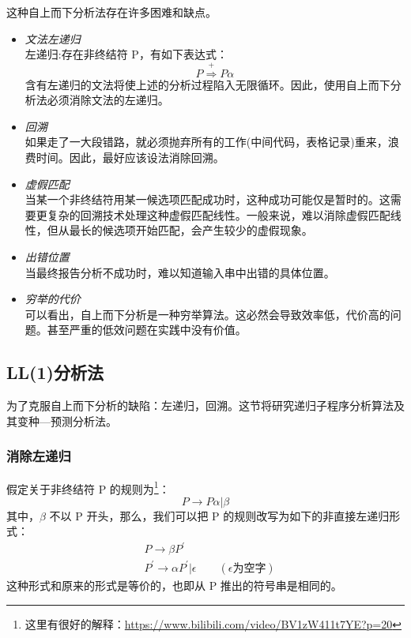 这种自上而下分析法存在许多困难和缺点。
\begin{itemize}
    \item \textit{文法左递归} \\
          左递归:存在非终结符 P，有如下表达式：
          \[P \stackrel{+}{\Rightarrow} P \alpha \]
          含有左递归的文法将使上述的分析过程陷入无限循环。因此，使用自上而下分析法必须消除文法的左递归。
    \item \textit{回溯} \\
          如果走了一大段错路，就必须抛弃所有的工作(中间代码，表格记录)重来，浪费时间。因此，最好应该设法消除回溯。
    \item \textit{虚假匹配} \\
          当某一个非终结符用某一候选项匹配成功时，这种成功可能仅是暂时的。这需要更复杂的回溯技术处理这种虚假匹配线性。一般来说，难以消除虚假匹配线性，但从最长的候选项开始匹配，会产生较少的虚假现象。
    \item \textit{出错位置} \\
          当最终报告分析不成功时，难以知道输入串中出错的具体位置。
    \item \textit{穷举的代价} \\
          可以看出，自上而下分析是一种穷举算法。这必然会导致效率低，代价高的问题。甚至严重的低效问题在实践中没有价值。
\end{itemize}

\subsection{LL(1)分析法}

为了克服自上而下分析的缺陷：左递归，回溯。这节将研究递归子程序分析算法及其变种—预测分析法。

\subsubsection{\textcolor{imp}{消除左递归}}

假定关于非终结符 P 的规则为\footnote{这里有很好的解释：\url{https://www.bilibili.com/video/BV1zW411t7YE?p=20}}：
\[ P \rightarrow P\alpha|\beta \]
其中，$\beta$ 不以 P 开头，那么，我们可以把 P 的规则改写为如下的非直接左递归形式：
\begin{equation}
    \begin{aligned}
         & P \rightarrow \beta P^{'}                                                            \\
         & P^{'} \rightarrow \alpha P^{'} | \epsilon \qquad (\epsilon \text{为空字})  \nonumber
    \end{aligned}
\end{equation}
这种形式和原来的形式是等价的，也即从 P 推出的符号串是相同的。

